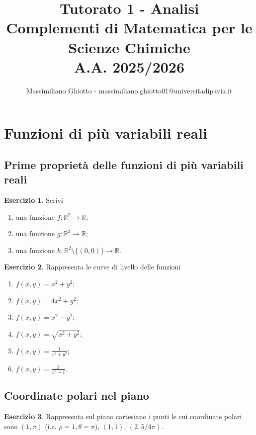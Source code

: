 \documentclass[12pt,a4paper]{article}
\title{Tutorato 1 - Analisi \\Complementi di Matematica per le Scienze Chimiche\\ A.A. 2025/2026}
\author{Massimiliano Ghiotto - massimiliano.ghiotto01@universitadipavia.it}
\date{}
\theoremstyle{definition}
\newtheorem{exe}{Esercizio}
\begin{document}
\maketitle

\section*{Funzioni di più variabili reali}

\subsection*{Prime proprietà delle funzioni di più variabili reali}

\begin{exe}
    Scrivi
    \begin{enumerate}
        \item una funzione $f: \mathbb{R}^2 \to \mathbb{R}$;
        \item una funzione $g: \mathbb{R}^3 \to \mathbb{R}$;
        \item una funzione $h: \mathbb{R}^2 \setminus \{(0,0)\} \to \mathbb{R}$.
    \end{enumerate}
\end{exe}

\begin{exe}
    Rappresenta le curve di livello delle funzioni
    \begin{enumerate}
        \item $f(x,y) = x^2 + y^2$;
        \item $f(x,y) = 4x^2 + y^2$;
        \item $f(x,y) = x^2 - y^2$;
        \item $f(x,y) = \sqrt{x^2 + y^2}$;
        \item $f(x,y) = \frac{1}{x^2 + y^2}$;
        \item $f(x,y) = \frac{y}{x^2 - 1}$.
    \end{enumerate}
\end{exe}

\subsection*{Coordinate polari nel piano}

\begin{exe}
    Rappresenta sul piano cartesiano i punti le cui coordinate polari sono $(1, \pi)$ (i.e. $\rho=1, \theta=\pi$), $(1, 1)$, $(2, 5/4 \pi)$.
\end{exe}
\end{document}
